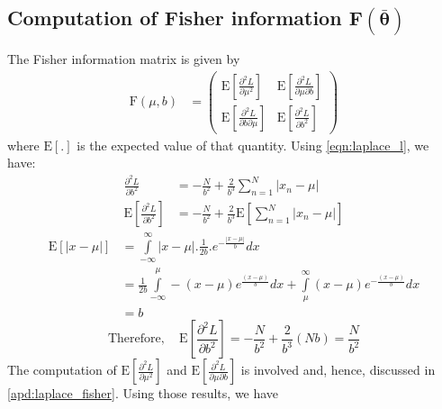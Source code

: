 \documentclass[wcp]{jmlr}
\begin{document}
\subsection*{Computation of Fisher information $\mathbf{F(\bar{\boldsymbol{\theta}})}$}
The Fisher information matrix is given by
\begin{align*}
  \mathrm{F}(\mu,b) &= \left( \begin{array}{cc}
  \mathrm{E} \left[\frac{\partial^2 L}{\partial \mu^2}\right] & \mathrm{E} \left[\frac{\partial^2 L}{\partial\mu \partial b}\right] \\
  \mathrm{E} \left[\frac{\partial^2 L}{\partial b \partial\mu}\right] & \mathrm{E} \left[\frac{\partial^2 L}{\partial b^2}\right] 
  \end{array} \right) 
\end{align*}
where $\mathrm{E}[.]$ is the expected value of that quantity. Using \autoref{eqn:laplace_l}, we have:
\begin{align*}
 \frac{\partial^2 L}{\partial b^2} &= -\frac{N}{b^2} + \frac{2}{b^3} \sum_{n=1}^N |x_n-\mu| \\
 \mathrm{E} \left[\frac{\partial^2 L}{\partial b^2}\right] &= -\frac{N}{b^2} + \frac{2}{b^3} \mathrm{E}\left[\sum_{n=1}^N |x_n-\mu|\right]
\end{align*}
\begin{align*}
 \mathrm{E}\left[|x-\mu|\right] &= \int\limits_{-\infty}^{\infty} |x-\mu| . \frac{1}{2b} . e^{-\frac{|x-\mu|}{b}} dx \\
 &= \frac{1}{2b} \int\limits_{-\infty}^{\mu} -(x-\mu) e^{\frac{(x-\mu)}{b}} dx + \int\limits_{\mu}^{\infty} (x-\mu)e^{-\frac{(x-\mu)}{b}} dx \\
 &= b
\end{align*}
\begin{equation}
 \mathrm{Therefore,}\quad \mathrm{E} \left[\frac{\partial^2 L}{\partial b^2}\right] = -\frac{N}{b^2} + \frac{2}{b^3} (Nb) = \frac{N}{b^2} \label{eqn:fisher_44} 
\end{equation}
The computation of $\mathrm{E}\left[\frac{\partial^2 L}{\partial \mu^2}\right]$ and 
$\mathrm{E}\left[\frac{\partial^2 L}{\partial \mu \partial b}\right]$ is involved and, hence,
discussed in \autoref{apd:laplace_fisher}. Using those results, we have
\end{document}
